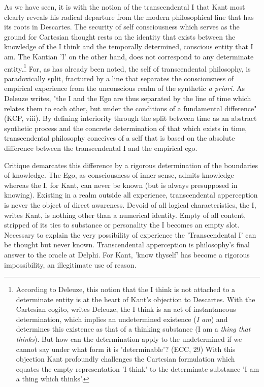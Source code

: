 As we have seen, it is with the notion of the transcendental I that Kant most clearly reveals his radical departure from the modern philosophical line that has its roots in Descartes. The security of self consciousness which serves as the ground for Cartesian thought rests on the identity that exists between the knowledge of the I think and the temporally determined, conscious entity that I am. The Kantian 'I' on the other hand, does not correspond to any determinate entity.\footnote{According to Deleuze, this notion that the I think is not attached to a determinate entity is at the heart of Kant's objection to Descartes. With the Cartesian cogito, writes Deleuze, the I think is an act of instantaneous determination, which implies an undetermined existence (\textit{I am}) and determines this existence as that of a thinking substance (I am a \textit{thing that thinks}). But how can the determination apply to the undetermined if we cannot say under what form it is 'determinable'? (ECC, 29) With this objection Kant profoundly challenges the Cartesian formulation which equates the empty representation 'I think' to the determinate substance 'I am a thing which thinks'.} For, as has already been noted, the self of transcendental philosophy, is paradoxically split, fractured by a line that separates the consciousness of empirical experience from the unconscious realm of the synthetic \textit{a priori}. As Deleuze writes, "the I and the Ego are thus separated by the line of time which relates them to each other, but under the conditions of a fundamental difference" (KCP, viii). By defining interiority through the split between time as an abstract synthetic process and the concrete determination of that which exists in time, transcendental philosophy conceives of a self that is based on the absolute difference between the transcendental I and the empirical ego.

Critique demarcates this difference by a rigorous determination of the boundaries of knowledge. The Ego, as consciousness of inner sense, admits knowledge whereas the I, for Kant, can never be known (but is always presupposed in knowing). Existing in a realm outside all experience, transcendental apperception is never the object of direct awareness. Devoid of all logical characteristics, the I, writes Kant, is nothing other than a numerical identity. Empty of all content, stripped of its ties to substance or personality the I becomes an empty slot. Necessary to explain the very possibility of experience the 'Transcendental I' can be thought but never known. Transcendental apperception is philosophy's final answer to the oracle at Delphi. For Kant, 'know thyself' has become a rigorous impossibility, an illegitimate use of reason.

